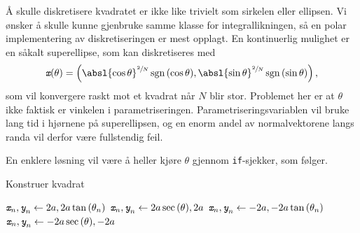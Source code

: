 Å skulle diskretisere kvadratet er ikke like trivielt som sirkelen eller ellipsen.
Vi ønsker å skulle kunne gjenbruke samme klasse for integrallikningen, så en polar implementering av diskretiseringen er mest opplagt.
En kontinuerlig mulighet er en såkalt superellipse, som kan diskretiseres med
\[
    \xtt(\theta) = \left( {\absl{\cos{\theta}}}^{\sfrac{2}{N}}\sgn{(\cos{\theta})}, {\absl{\sin{\theta}}}^{\sfrac{2}{N}}\sgn{(\sin{\theta})} \right),
\]
som vil konvergere raskt mot et kvadrat når $N$ blir stor.
Problemet her er at $\theta$ ikke faktisk er vinkelen i parametriseringen.
Parametriseringsvariablen vil bruke lang tid i hjørnene på superellipsen, og en enorm andel av normalvektorene langs randa vil derfor være fullstendig feil.

En enklere løsning vil være å heller kjøre $\theta$ gjennom \texttt{if}-sjekker, som følger.
\begin{algorithm}[H]
    \caption{Konstruer kvadrat}\label{alg:kvadrat}
    \begin{algorithmic}
            \If{$\theta_n \in [-\sfrac{\pi}{4}, \sfrac{\pi}{4})$}
                \State ${\textit{\texttt{x}}}_n, {\textit{\texttt{y}}}_n \gets 2a, 2a\tan{(\theta_n)}$
            \ElsIf{$\theta_n \in [\sfrac{\pi}{4}, \sfrac{3\pi}{4})$}
                \State ${\textit{\texttt{x}}}_n, {\textit{\texttt{y}}}_n \gets 2a\sec{(\theta)}, 2a$
            \ElsIf{$\theta_n \in [3\sfrac{\pi}{4}, \sfrac{5\pi}{4})$}
                \State ${\textit{\texttt{x}}}_n, {\textit{\texttt{y}}}_n \gets -2a, -2a\tan{(\theta_n)}$
            \ElsIf{$\theta_n \in [\sfrac{5\pi}{4}, \sfrac{7\pi}{4})$}
                \State ${\textit{\texttt{x}}}_n, {\textit{\texttt{y}}}_n \gets -2a\sec{(\theta)}, -2a$
            \EndIf
        \EndFor
    \end{algorithmic}
\end{algorithm}

